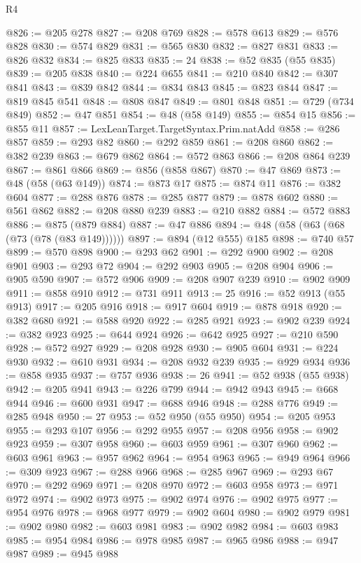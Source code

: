\begin{lexlean}{R4}
\begin{coremodule}
@826 := @205 @278
@827 := @208 @769
@828 := @578 @613
@829 := @576 @828
@830 := @574 @829
@831 := @565 @830
@832 := @827 @831
@833 := @826 @832
@834 := @825 @833
@835 := 24
@838 := @52 @835 (@55 @835)
@839 := @205 @838
@840 := @224 @655
@841 := @210 @840
@842 := @307 @841
@843 := @839 @842
@844 := @834 @843
@845 := @823 @844
@847 := @819 @845 @541
@848 := @808 @847
@849 := @801 @848
@851 := @729 (@734 @849)
@852 := @47 @851
@854 := @48 (@58 @149)
@855 := @854 @15
@856 := @855 @11
@857 := LexLeanTarget.TargetSyntax.Prim.natAdd
@858 := @286 @857
@859 := @293 @82
@860 := @292 @859
@861 := @208 @860
@862 := @382 @239
@863 := @679 @862
@864 := @572 @863
@866 := @208 @864 @239
@867 := @861 @866
@869 := @856 (@858 @867)
@870 := @47 @869
@873 := @48 (@58 (@63 @149))
@874 := @873 @17
@875 := @874 @11
@876 := @382 @604
@877 := @288 @876
@878 := @285 @877
@879 := @878 @602
@880 := @561 @862
@882 := @208 @880 @239
@883 := @210 @882
@884 := @572 @883
@886 := @875 (@879 @884)
@887 := @47 @886
@894 := @48 (@58 (@63 (@68 (@73 (@78 (@83 @149))))))
@897 := @894 (@12 @555) @185
@898 := @740 @57
@899 := @570 @898
@900 := @293 @62
@901 := @292 @900
@902 := @208 @901
@903 := @293 @72
@904 := @292 @903
@905 := @208 @904
@906 := @905 @590
@907 := @572 @906
@909 := @208 @907 @239
@910 := @902 @909
@911 := @858 @910
@912 := @731 @911
@913 := 25
@916 := @52 @913 (@55 @913)
@917 := @205 @916
@918 := @917 @604
@919 := @878 @918
@920 := @382 @680
@921 := @588 @920
@922 := @285 @921
@923 := @902 @239
@924 := @382 @923
@925 := @644 @924
@926 := @642 @925
@927 := @210 @590
@928 := @572 @927
@929 := @208 @928
@930 := @905 @604
@931 := @224 @930
@932 := @610 @931
@934 := @208 @932 @239
@935 := @929 @934
@936 := @858 @935
@937 := @757 @936
@938 := 26
@941 := @52 @938 (@55 @938)
@942 := @205 @941
@943 := @226 @799
@944 := @942 @943
@945 := @668 @944
@946 := @600 @931
@947 := @688 @946
@948 := @288 @776
@949 := @285 @948
@950 := 27
@953 := @52 @950 (@55 @950)
@954 := @205 @953
@955 := @293 @107
@956 := @292 @955
@957 := @208 @956
@958 := @902 @923
@959 := @307 @958
@960 := @603 @959
@961 := @307 @960
@962 := @603 @961
@963 := @957 @962
@964 := @954 @963
@965 := @949 @964
@966 := @309 @923
@967 := @288 @966
@968 := @285 @967
@969 := @293 @67
@970 := @292 @969
@971 := @208 @970
@972 := @603 @958
@973 := @971 @972
@974 := @902 @973
@975 := @902 @974
@976 := @902 @975
@977 := @954 @976
@978 := @968 @977
@979 := @902 @604
@980 := @902 @979
@981 := @902 @980
@982 := @603 @981
@983 := @902 @982
@984 := @603 @983
@985 := @954 @984
@986 := @978 @985
@987 := @965 @986
@988 := @947 @987
@989 := @945 @988

\end{coremodule}
\end{lexlean}
